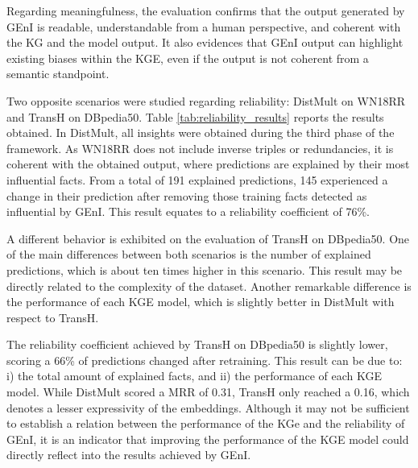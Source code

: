 Regarding meaningfulness, the evaluation confirms that the output generated by GEnI is readable, understandable from a human perspective, and coherent with the KG and the model output. It also evidences that GEnI output can highlight existing biases within the KGE, even if the output is not coherent from a semantic standpoint.

Two opposite scenarios were studied regarding reliability: DistMult on WN18RR and TransH on DBpedia50. Table \ref{tab:reliability_results} reports the results obtained. In DistMult, all insights were obtained during the third phase of the framework. As WN18RR does not include inverse triples or redundancies, it is coherent with the obtained output, where predictions are explained by their most influential facts. From a total of 191 explained predictions, 145 experienced a change in their prediction after removing those training facts detected as influential by GEnI. This result equates to a reliability coefficient of 76\%.

A different behavior is exhibited on the evaluation of TransH on DBpedia50. One of the main differences between both scenarios is the number of explained predictions, which is about ten times higher in this scenario. This result may be directly related to the complexity of the dataset. Another remarkable difference is the performance of each KGE model, which is slightly better in DistMult with respect to TransH.

The reliability coefficient achieved by TransH on DBpedia50 is slightly lower, scoring a 66\% of predictions changed after retraining. This result can be due to: i) the total amount of explained facts, and ii) the performance of each KGE model. While DistMult scored a MRR of 0.31, TransH only reached a 0.16, which denotes a lesser expressivity of the embeddings. Although it may not be sufficient to establish a relation between the performance of the KGe and the reliability of GEnI, it is an indicator that improving the performance of the KGE model could directly reflect into the results achieved by GEnI.

\color{black}

